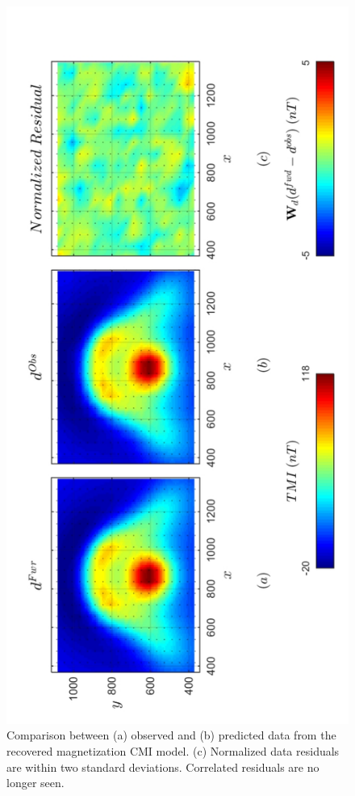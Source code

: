 \begin{figure}[h!]
\centering
\includegraphics[scale=0.52, angle =270]{3D_Inv_l0l1_pred_AMI.pdf}
\caption{ Comparison between (a) observed and (b) predicted data from the recovered magnetization CMI model. (c) Normalized data residuals are within two standard deviations. Correlated residuals are no longer seen.}
\label{fig:3D_Inv_l2l2_pred_AMI}
\end{figure}

